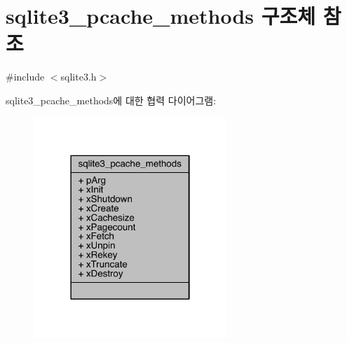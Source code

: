 \hypertarget{structsqlite3__pcache__methods}{}\section{sqlite3\+\_\+pcache\+\_\+methods 구조체 참조}
\label{structsqlite3__pcache__methods}


{\ttfamily \#include $<$sqlite3.\+h$>$}



sqlite3\+\_\+pcache\+\_\+methods에 대한 협력 다이어그램\+:
\nopagebreak
\begin{figure}[H]
\begin{center}
\leavevmode
\includegraphics[width=206pt]{db/df8/structsqlite3__pcache__methods__coll__graph}
\end{center}
\end{figure}
